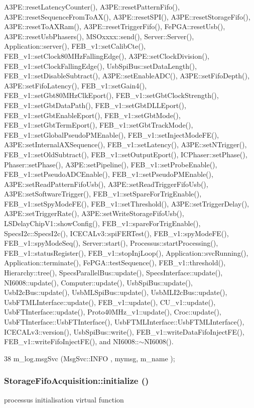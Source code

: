 A3PE::resetLatencyCounter(), A3PE::resetPatternFifo(), A3PE::resetSequenceFromToAX(), A3PE::resetSPI(), A3PE::resetStorageFifo(), A3PE::resetToAXRam(), A3PE::resetTriggerFifo(), FePGA::resetUsb(), A3PE::resetUsbPhasers(), MSOxxxx::send(), Server::Server(), Application::server(), FEB\_\-v1::setCalibCte(), FEB\_\-v1::setClock80MHzFallingEdge(), A3PE::setClockDivision(), FEB\_\-v1::setClockFallingEdge(), UsbSpiBus::setDataLength(), FEB\_\-v1::setDisableSubtract(), A3PE::setEnableADC(), A3PE::setFifoDepth(), A3PE::setFifoLatency(), FEB\_\-v1::setGain4(), FEB\_\-v1::setGbt80MHzClkEport(), FEB\_\-v1::setGbtClockStrength(), FEB\_\-v1::setGbtDataPath(), FEB\_\-v1::setGbtDLLEport(), FEB\_\-v1::setGbtEnableEport(), FEB\_\-v1::setGbtMode(), FEB\_\-v1::setGbtTermEport(), FEB\_\-v1::setGbtTrackMode(), FEB\_\-v1::setGlobalPseudoPMEnable(), FEB\_\-v1::setInjectModeFE(), A3PE::setInternalAXSequence(), FEB\_\-v1::setLatency(), A3PE::setNTrigger(), FEB\_\-v1::setOldSubtract(), FEB\_\-v1::setOutputEport(), ICPhaser::setPhase(), Phaser::setPhase(), A3PE::setPipeline(), FEB\_\-v1::setProbeEnable(), FEB\_\-v1::setPseudoADCEnable(), FEB\_\-v1::setPseudoPMEnable(), A3PE::setReadPatternFifoUsb(), A3PE::setReadTriggerFifoUsb(), A3PE::setSoftwareTrigger(), FEB\_\-v1::setSpareForTrigEnable(), FEB\_\-v1::setSpyModeFE(), FEB\_\-v1::setThreshold(), A3PE::setTriggerDelay(), A3PE::setTriggerRate(), A3PE::setWriteStorageFifoUsb(), LSDelayChipV1::showConfig(), FEB\_\-v1::spareForTrigEnable(), SpecsI2c::SpecsI2c(), ICECALv3::spiFERTest(), FEB\_\-v1::spyModeFE(), FEB\_\-v1::spyModeSeq(), Server::start(), Processus::startProcessing(), FEB\_\-v1::statusRegister(), FEB\_\-v1::stopInjLoop(), Application::svcRunning(), Application::terminate(), FePGA::testSequence(), FEB\_\-v1::threshold(), Hierarchy::tree(), SpecsParallelBus::update(), SpecsInterface::update(), NI6008::update(), Computer::update(), UsbSpiBus::update(), UsbI2cBus::update(), UsbMLSpiBus::update(), UsbMLI2cBus::update(), UsbFTMLInterface::update(), FEB\_\-v1::update(), CU\_\-v1::update(), UsbFTInterface::update(), Proto40MHz\_\-v1::update(), Croc::update(), UsbFTInterface::UsbFTInterface(), UsbFTMLInterface::UsbFTMLInterface(), ICECALv3::version(), UsbSpiBus::write(), FEB\_\-v1::writeDataFifoInjectFE(), FEB\_\-v1::writeFifoInjectFE(), and NI6008::$\sim$NI6008().


\begin{DoxyCode}
38 { m_log.msgSvc (MsgSvc::INFO    , mymsg, m_name ); }
\end{DoxyCode}
\hypertarget{classStorageFifoAcquisition_a9cf77a05d754282e7737fb439bfa835d}{
\subsubsection[{initialize}]{ StorageFifoAcquisition::initialize ()}}
\label{classStorageFifoAcquisition_a9cf77a05d754282e7737fb439bfa835d}
processus initialisation virtual function 

